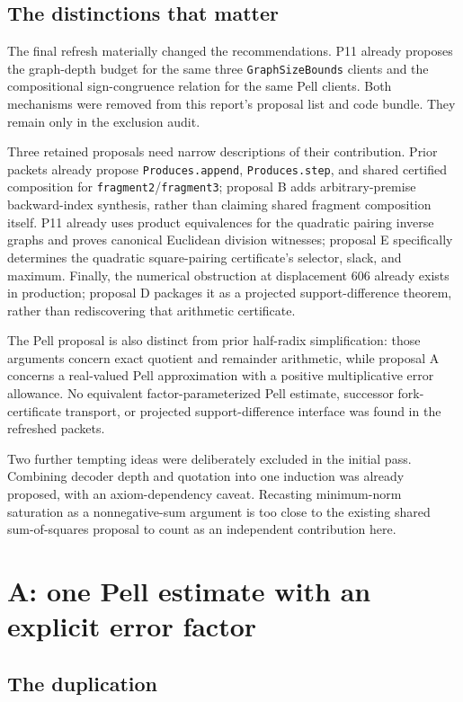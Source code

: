 \documentclass[11pt]{article}
\theoremstyle{remark}\newtheorem{remark}[proposition]{Remark}
\newcommand{\code}[1]{\nolinkurl{#1}}
\begin{document}
\subsection{The distinctions that matter}

The final refresh materially changed the recommendations. P11 already proposes the graph-depth budget for the same three \code{GraphSizeBounds} clients and the compositional sign-congruence relation for the same Pell clients. Both mechanisms were removed from this report's proposal list and code bundle. They remain only in the exclusion audit.

Three retained proposals need narrow descriptions of their contribution. Prior packets already propose \code{Produces.append}, \code{Produces.step}, and shared certified composition for \code{fragment2}/\code{fragment3}; proposal B adds arbitrary-premise backward-index synthesis, rather than claiming shared fragment composition itself. P11 already uses product equivalences for the quadratic pairing inverse graphs and proves canonical Euclidean division witnesses; proposal E specifically determines the quadratic square-pairing certificate's selector, slack, and maximum. Finally, the numerical obstruction at displacement 606 already exists in production; proposal D packages it as a projected support-difference theorem, rather than rediscovering that arithmetic certificate.

The Pell proposal is also distinct from prior half-radix simplification: those arguments concern exact quotient and remainder arithmetic, while proposal A concerns a real-valued Pell approximation with a positive multiplicative error allowance. No equivalent factor-parameterized Pell estimate, successor fork-certificate transport, or projected support-difference interface was found in the refreshed packets.

Two further tempting ideas were deliberately excluded in the initial pass. Combining decoder depth and quotation into one induction was already proposed, with an axiom-dependency caveat. Recasting minimum-norm saturation as a nonnegative-sum argument is too close to the existing shared sum-of-squares proposal to count as an independent contribution here.

\section{A: one Pell estimate with an explicit error factor}\label{sec:pell}

\subsection{The duplication}
\end{document}
